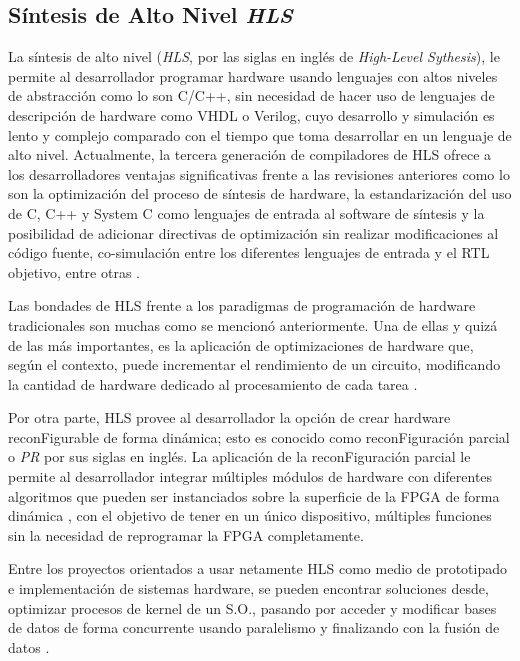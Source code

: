 \subsection{Síntesis de Alto Nivel \textit{HLS}}

La síntesis de alto nivel (\textit{HLS}, por las siglas en inglés de \textit{High-Level Sythesis}), le permite al desarrollador programar hardware usando lenguajes con altos niveles de abstracción como lo son C/C++, sin necesidad de hacer uso de lenguajes de descripción de hardware como VHDL o Verilog, cuyo desarrollo y simulación es lento y complejo comparado con el tiempo que toma desarrollar en un lenguaje de alto nivel. Actualmente, la tercera generación de compiladores de HLS ofrece a los desarrolladores ventajas significativas frente a las revisiones anteriores como lo son la optimización del proceso de síntesis de hardware, la estandarización del uso de C, C++ y System C como lenguajes de entrada al software de síntesis y la posibilidad de adicionar directivas de optimización sin realizar modificaciones al código fuente, co-simulación entre los diferentes lenguajes de entrada y el RTL objetivo, entre otras \cite{HLStory}.

Las bondades de HLS frente a los paradigmas de programación de hardware tradicionales son muchas como se mencionó anteriormente. Una de ellas y quizá de las más importantes, es la aplicación de optimizaciones de hardware que, según el contexto, puede incrementar el rendimiento de un circuito, modificando la cantidad de hardware dedicado al procesamiento de cada tarea \cite{HLSeffect,canis2013legup}. 

Por otra parte, HLS provee al desarrollador la opción de crear hardware reconFigurable de forma dinámica; esto es conocido como reconFiguración parcial o \textit{PR} por sus siglas en inglés. La aplicación de la reconFiguración parcial le permite al desarrollador integrar múltiples módulos de hardware con diferentes algoritmos que pueden ser instanciados sobre la superficie de la FPGA de forma dinámica \citep{kao2005benefits,wehner2014using,owens2013design}, con el objetivo de tener en un único dispositivo, múltiples funciones sin la necesidad de reprogramar la FPGA completamente.

Entre los proyectos orientados a usar netamente HLS como medio de prototipado e implementación de sistemas hardware, se pueden encontrar soluciones desde, optimizar procesos de kernel de un S.O., pasando por acceder y modificar bases de datos de forma concurrente usando paralelismo y finalizando con la fusión de datos  \citep{liu2013soft,monson2015using,navarro2013high,malazgirt2015high,choi2013software,alias2013optimizing,zhao2015area,liu2015moving}.

